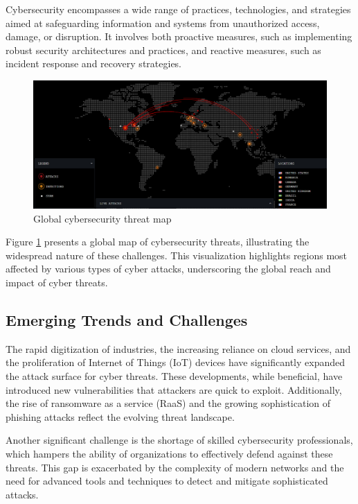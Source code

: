 Cybersecurity encompasses a wide range of practices, technologies, and strategies aimed at safeguarding information and systems from unauthorized access, damage, or disruption. It involves both proactive measures, such as implementing robust security architectures and practices, and reactive measures, such as incident response and recovery strategies.

\begin{figure}
    \centering
    \includegraphics[width=\textwidth]{../Thesis_Docs/media/maps.png}
    \caption{Global cybersecurity threat map \cite{bitdefender}}
    \label{fig:maps}
\end{figure}

Figure \ref{fig:maps} presents a global map of cybersecurity threats, illustrating the widespread nature of these challenges. This visualization highlights regions most affected by various types of cyber attacks, underscoring the global reach and impact of cyber threats.

\subsection{Emerging Trends and Challenges}

The rapid digitization of industries, the increasing reliance on cloud services, and the proliferation of Internet of Things (IoT) devices have significantly expanded the attack surface for cyber threats. These developments, while beneficial, have introduced new vulnerabilities that attackers are quick to exploit. Additionally, the rise of ransomware as a service (RaaS) and the growing sophistication of phishing attacks reflect the evolving threat landscape.

Another significant challenge is the shortage of skilled cybersecurity professionals, which hampers the ability of organizations to effectively defend against these threats. This gap is exacerbated by the complexity of modern networks and the need for advanced tools and techniques to detect and mitigate sophisticated attacks.

